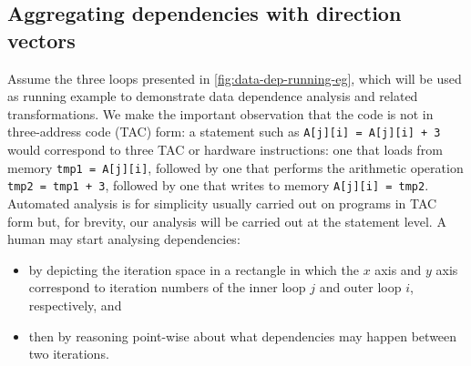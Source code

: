 \subsection{Aggregating dependencies with direction vectors}

Assume the three loops presented in \cref{fig:data-dep-running-eg},
which will be used as running example to demonstrate data dependence
analysis and related transformations. We make the important
observation that the code is not in three-address code (TAC) form: a
statement such as \texttt{A[j][i] = A[j][i] + 3} would correspond to
three TAC or hardware instructions: one that loads from memory
\texttt{tmp1 = A[j][i]}, followed by one that performs the arithmetic
operation \texttt{tmp2 = tmp1 + 3}, followed by one that writes to
memory \texttt{A[j][i] = tmp2}. Automated analysis is for simplicity
usually carried out on programs in TAC form but, for brevity, our
analysis will be carried out at the statement level.
A human may start analysing dependencies:
\begin{itemize}
\item by depicting the iteration space in a rectangle in which the $x$
  axis and $y$ axis correspond to iteration numbers of the inner
  loop $j$ and outer loop $i$, respectively, and
\item then by reasoning point-wise about what dependencies may
  happen between two iterations.
\end{itemize}

